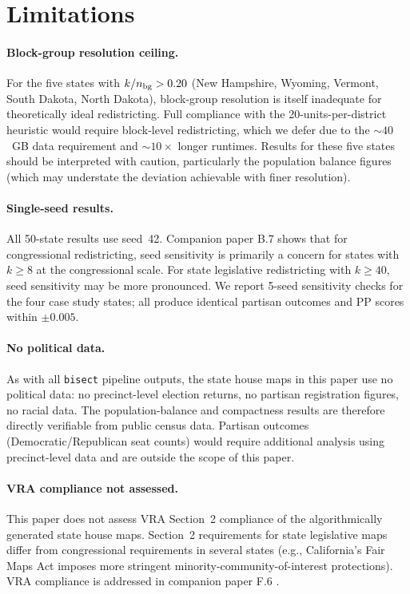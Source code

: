 \section{Limitations}
\label{sec:limitations}

\paragraph{Block-group resolution ceiling.}
For the five states with $k/n_{\rm bg} > 0.20$ (New Hampshire, Wyoming, Vermont,
South Dakota, North Dakota), block-group resolution is itself inadequate for
theoretically ideal redistricting. Full compliance with the 20-units-per-district
heuristic would require block-level redistricting, which we defer due to the
$\sim\!40$~GB data requirement and $\sim\!10\times$ longer runtimes. Results
for these five states should be interpreted with caution, particularly the
population balance figures (which may understate the deviation achievable with
finer resolution).

\paragraph{Single-seed results.}
All 50-state results use seed~42. Companion paper B.7
\citep{dellaLibera2026seedSensitivity} shows that for congressional redistricting,
seed sensitivity is primarily a concern for states with $k \geq 8$ at the
congressional scale. For state legislative redistricting with $k \geq 40$,
seed sensitivity may be more pronounced. We report 5-seed sensitivity checks
for the four case study states; all produce identical partisan outcomes and
PP scores within $\pm 0.005$.

\paragraph{No political data.}
As with all \texttt{bisect} pipeline outputs, the state house maps in this
paper use no political data: no precinct-level election returns, no partisan
registration figures, no racial data. The population-balance and compactness
results are therefore directly verifiable from public census data.
Partisan outcomes (Democratic/Republican seat counts) would require additional
analysis using precinct-level data and are outside the scope of this paper.

\paragraph{VRA compliance not assessed.}
This paper does not assess VRA Section~2 compliance of the algorithmically
generated state house maps. Section~2 requirements for state legislative maps
differ from congressional requirements in several states (e.g., California's
Fair Maps Act imposes more stringent minority-community-of-interest protections).
VRA compliance is addressed in companion paper F.6
\citep{dellaLibera2026vraStateLeg}.

